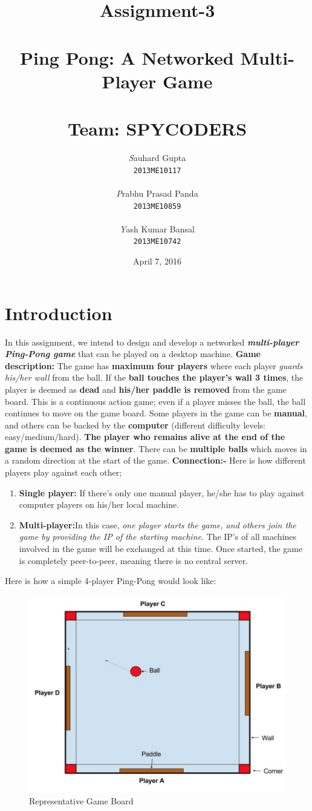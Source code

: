 \documentclass{article}
\title{%
  \Huge{\textbf{Assignment-3}} \\ $ $\\
  \huge{\textbf{Ping Pong: A Networked Multi-Player Game}} \\ $ $ \\
  \textbf{\huge Team: SPYCODERS }}
\author{\Large{\textit{S}auhard Gupta \\ \texttt{2013ME10117}
\\$ $ \\ \textit{P}rabhu Prasad Panda \\ \texttt{2013ME10859}
\\$ $ \\ \textit{Y}ash Kumar Bansal \\ \texttt{2013ME10742}}}
\date{April 7, 2016}
\begin{document}
\maketitle
\newpage
\tableofcontents
\newpage
\section{Introduction}
In this assignment, we intend to design and develop a networked \textbf{\textit{multi-player Ping-Pong game}} that can be played on a desktop machine.
\newline
\newline
\textbf{Game description:}
\newline
The game has \textbf{maximum four players} where each player \textit{guards his/her wall }from the ball. If the \textbf{ball touches the player’s wall 3 times}, the player is deemed as \textbf{dead} and \textbf{his/her paddle is removed} from the game board. This is a continuous action game; even if a player misses the ball, the ball continues to move on the game board. Some players in the game can be \textbf{manual}, and others can be backed by the \textbf{computer} (different difficulty levels: easy/medium/hard). \textbf{The player who remains alive at the end of the game is deemed as the winner}. There can be \textbf{multiple balls} which moves in a random direction at the start of the game. 
\newline
\newline
\textbf{Connection:-} Here is how different players play against each other;
\begin{enumerate}
\item \textbf{Single player:} If there’s only one manual player, he/she has to play against computer players on his/her local machine.  
\item \textbf{Multi-player:}In this case, \textit{one player starts the game, and others join the game by providing the IP of the starting machine}. The IP's of all machines involved in the game will be exchanged at this time. Once started, the game is completely peer-to-peer, meaning there is no central server. 
\end{enumerate}
Here is how a simple 4-player Ping-Pong would look like:
\newline
\begin{figure}[h!]
    \centering
    \includegraphics[width=.5\textwidth]{game_board}
    \caption{Representative Game Board}
\end{figure}
\end{document}
